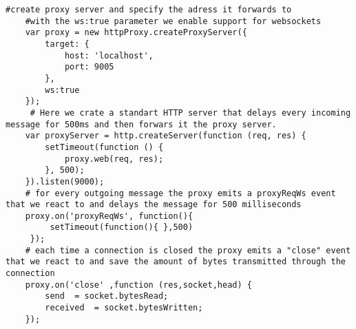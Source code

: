 \begin{lstlisting}[caption={Setting up a proxy that simulates latency with node-http-proxy}]
	#create proxy server and specify the adress it forwards to
	#with the ws:true parameter we enable support for websockets
 	var proxy = new httpProxy.createProxyServer({
 		target: {
 			host: 'localhost',
 			port: 9005
 		},
 		ws:true 
 	});
 	 # Here we crate a standart HTTP server that delays every incoming message for 500ms and then forwars it the proxy server.
 	var proxyServer = http.createServer(function (req, res) {
 		setTimeout(function () {
 			proxy.web(req, res);
 		}, 500);
 	}).listen(9000);
 	# for every outgoing message the proxy emits a proxyReqWs event that we react to and delays the message for 500 milliseconds
 	proxy.on('proxyReqWs', function(){
 		 setTimeout(function(){ },500) 
 	 });
  	# each time a connection is closed the proxy emits a "close" event that we react to and save the amount of bytes transmitted through the connection
 	proxy.on('close' ,function (res,socket,head) { 
 		send  = socket.bytesRead;
 		received  = socket.bytesWritten;
 	});
 \end{lstlisting}



 